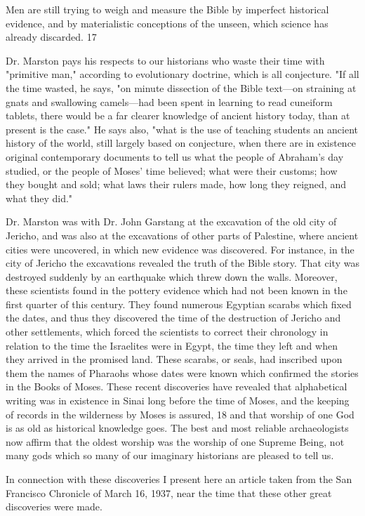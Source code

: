 Men are still trying to weigh and measure the Bible by imperfect historical evidence, and by
materialistic conceptions of the unseen, which science has already discarded. 17

Dr. Marston pays his respects to our historians who waste their time with "primitive man,"
according to evolutionary doctrine, which is all conjecture. "If all the time wasted, he says,
"on minute dissection of the Bible text—on straining at gnats and swallowing camels—had
been spent in learning to read cuneiform tablets, there would be a far clearer knowledge of
ancient history today, than at present is the case." He says also, "what is the use of teaching
students an ancient history of the world, still largely based on conjecture, when there are in
existence original contemporary documents to tell us what the people of Abraham's day
studied, or the people of Moses' time believed; what were their customs; how they bought
and sold; what laws their rulers made, how long they reigned, and what they did."

Dr. Marston was with Dr. John Garstang at the excavation of the old city of Jericho, and was
also at the excavations of other parts of Palestine, where ancient cities were uncovered, in
which new evidence was discovered. For instance, in the city of Jericho the excavations
revealed the truth of the Bible story. That city was destroyed suddenly by an earthquake
which threw down the walls. Moreover, these scientists found in the pottery evidence which
had not been known in the first quarter of this century. They found numerous Egyptian
scarabs which fixed the dates, and thus they discovered the time of the destruction of Jericho
and other settlements, which forced the scientists to correct their chronology in relation to the
time the Israelites were in Egypt, the time they left and when they arrived in the promised
land. These scarabs, or seals, had inscribed upon them the names of Pharaohs whose dates
were known which confirmed the stories in the Books of Moses. These recent discoveries
have revealed that alphabetical writing was in existence in Sinai long before the time of
Moses, and the keeping of records in the wilderness by Moses is assured, 18 and that worship
of one God is as old as historical knowledge goes. The best and most reliable archaeologists
now affirm that the oldest worship was the worship of one Supreme Being, not many gods
which so many of our imaginary historians are pleased to tell us.

In connection with these discoveries I present here an article taken from the San Francisco
Chronicle of March 16, 1937, near the time that these other great discoveries were made.

